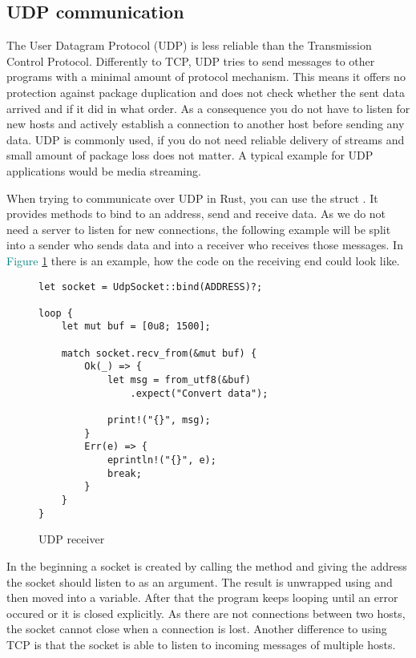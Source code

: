 \subsection{UDP communication}
The User Datagram Protocol (UDP) is less reliable than the Transmission Control Protocol. Differently to TCP, UDP tries
to send messages to other programs with a minimal amount of protocol mechanism. This means it offers no protection
against package duplication and does not check whether the sent data arrived and if it did in what order. As a
consequence you do not have to listen for new hosts and actively establish a connection to another host before sending
any data. UDP is commonly used, if you do not need reliable delivery of streams and small amount of package loss does
not matter. A typical example for UDP applications would be media streaming. \cite{RFC0768}

When trying to communicate over UDP in Rust, you can use the struct . It provides methods to
bind to an address, send and receive data. As we do not need a server to listen for new connections, the following
example will be split into a sender who sends data and into a receiver who receives those messages. In
\textcolor{teal}{Figure \ref{udp-receiver}} there is an example, how the code on the receiving end could look like.

\begin{figure}[ht]
    \begin{verbatim}
let socket = UdpSocket::bind(ADDRESS)?;

loop {
    let mut buf = [0u8; 1500];

    match socket.recv_from(&mut buf) {
        Ok(_) => {
            let msg = from_utf8(&buf)
                .expect("Convert data");

            print!("{}", msg);
        }
        Err(e) => {
            eprintln!("{}", e);
            break;
        }
    }
}
    \end{verbatim}
    \caption{UDP receiver}
    \label{udp-receiver}
\end{figure}

In the beginning a socket is created by calling the  method and giving the address the socket should listen
to as an argument. The result is unwrapped using  and then moved into a variable. After that the program keeps
looping until an error occured or it is closed explicitly. As there are not connections between two hosts, the socket
cannot close when a connection is lost. Another difference to using TCP is that the socket is able to listen to
incoming messages of multiple hosts.

